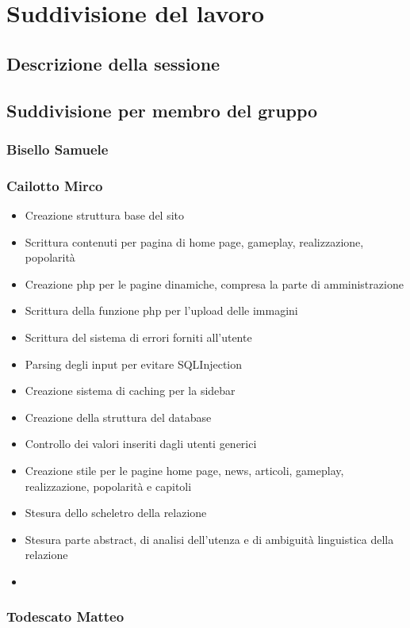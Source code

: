 \documentclass[openany, a4paper, 12pt]{report}
\begin{document}
	\chapter{Suddivisione del lavoro}
	\section{Descrizione della sessione}
	\section{Suddivisione per membro del gruppo}
	\subsection{Bisello Samuele}
	\subsection{Cailotto Mirco}
	\begin{itemize}
		\item Creazione struttura base del sito
		\item Scrittura contenuti per pagina di home page, gameplay, realizzazione, popolarità
		\item Creazione php per le pagine dinamiche, compresa la parte di amministrazione
		\item Scrittura della funzione php per l'upload delle immagini
		\item Scrittura del sistema di errori forniti all'utente
		\item Parsing degli input per evitare SQLInjection
		\item Creazione sistema di caching per la sidebar
		\item Creazione della struttura del database
		\item Controllo dei valori inseriti dagli utenti generici
		\item Creazione stile per le pagine home page, news, articoli, gameplay, realizzazione, popolarità e capitoli
		\item Stesura dello scheletro della relazione
		\item Stesura parte abstract, di analisi dell'utenza e di ambiguità linguistica della relazione
		\item 
	\end{itemize}
	\subsection{Todescato Matteo}
\end{document}

